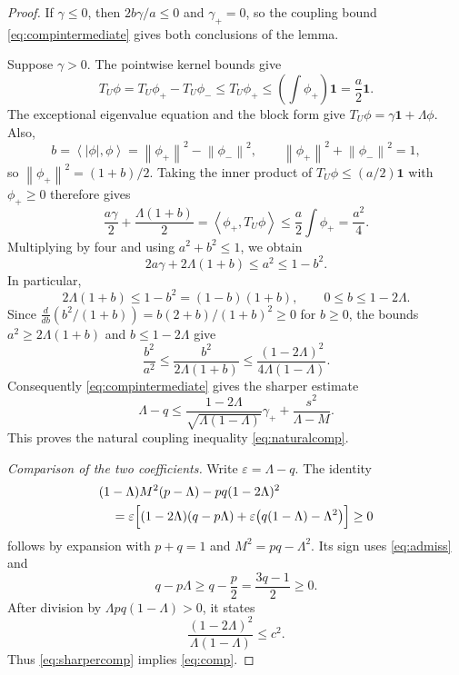\documentclass[11pt]{article}
\numberwithin{equation}{section}
\newcommand{\one}{\mathbf 1}
\newcommand{\norm}[1]{\left\lVert #1\right\rVert}
\newcommand{\ip}[2]{\left\langle #1,#2\right\rangle}
\begin{document}
\begin{proof}
If $\gamma\le0$, then $2b\gamma/a\le0$ and $\gamma_+=0$,
so the coupling bound \eqref{eq:compintermediate} gives both
conclusions of the lemma.

Suppose $\gamma>0$. The pointwise kernel bounds give
\[
 T_U\phi=T_U\phi_+-T_U\phi_-
  \le T_U\phi_+\le\left(\int\phi_+\right)\one
  =\frac a2\one.
\]
The exceptional eigenvalue equation and the block form give
$T_U\phi=\gamma\one+\Lambda\phi$. Also,
\[
 b=\ip{|\phi|}\phi=\norm{\phi_+}^2-\norm{\phi_-}^2,
 \qquad \norm{\phi_+}^2+\norm{\phi_-}^2=1,
\]
so $\norm{\phi_+}^2=(1+b)/2$. Taking the inner product of
$T_U\phi\le(a/2)\one$ with $\phi_+\ge0$ therefore gives
\[
 \frac{a\gamma}{2}+\frac{\Lambda(1+b)}2
  =\ip{\phi_+}{T_U\phi}
  \le\frac a2\int\phi_+=\frac{a^2}{4}.
\]
Multiplying by four and using $a^2+b^2\le1$, we obtain
\[
 2a\gamma+2\Lambda(1+b)\le a^2\le1-b^2.
\]
In particular,
\[
 2\Lambda(1+b)\le1-b^2=(1-b)(1+b),
 \qquad 0\le b\le1-2\Lambda.
\]
Since
$\frac{d}{db}(b^2/(1+b))=b(2+b)/(1+b)^2\ge0$ for $b\ge0$,
the bounds $a^2\ge2\Lambda(1+b)$ and $b\le1-2\Lambda$ give
\[
 \frac{b^2}{a^2}\le\frac{b^2}{2\Lambda(1+b)}
 \le\frac{(1-2\Lambda)^2}{4\Lambda(1-\Lambda)}.
\]
Consequently \eqref{eq:compintermediate} gives the sharper estimate
\begin{equation}\label{eq:sharpercomp}
 \Lambda-q\le\frac{1-2\Lambda}{\sqrt{\Lambda(1-\Lambda)}}\gamma_+
 +\frac{s^2}{\Lambda-M}.
\end{equation}
This proves the natural coupling inequality \eqref{eq:naturalcomp}.

\smallskip
\noindent\emph{Comparison of the two coefficients.}
Write $\varepsilon=\Lambda-q$. The identity
\begin{align}\label{eq:parametercert}
 &(1-\Lambda)M^2(p-\Lambda)-pq(1-2\Lambda)^2\notag\\
 &\quad=\varepsilon\Bigl[(1-2\Lambda)(q-p\Lambda)
 +\varepsilon\bigl(q(1-\Lambda)-\Lambda^2\bigr)\Bigr]
 \ge0
\end{align}
follows by expansion with $p+q=1$ and $M^2=pq-\Lambda^2$. Its sign uses \eqref{eq:admiss} and
\[
 q-p\Lambda\ge q-\frac p2=\frac{3q-1}{2}\ge0.
\]
After division by $\Lambda pq(1-\Lambda)>0$, it states
\[
 \frac{(1-2\Lambda)^2}{\Lambda(1-\Lambda)}\le c^2.
\]
Thus \eqref{eq:sharpercomp} implies \eqref{eq:comp}.
\end{proof}
\end{document}
